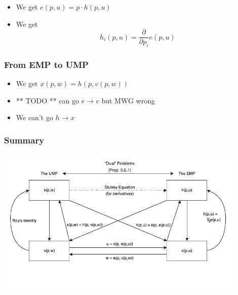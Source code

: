 \begin{itemize}
\item We get $e(p,u) = p \cdot h(p,u)$
\item We get 
  \[
  h_i(p,u) = \frac{\partial}{\partial p_i} e(p,u)
  \]
\end{itemize}

\subsubsection{From EMP to UMP}
\label{sec:from-emp-ump}

\begin{itemize}
\item We get $x(p,w) = h(p, v(p,w))$
\item ** TODO ** can go $e \to v$ but MWG wrong
\item We can't go $h \to x$
\end{itemize}

\subsubsection{Summary}
\label{sec:eu-duality-summary}

\includegraphics[width=0.9\textwidth]{./examnotes/mwg3d3.pdf}
